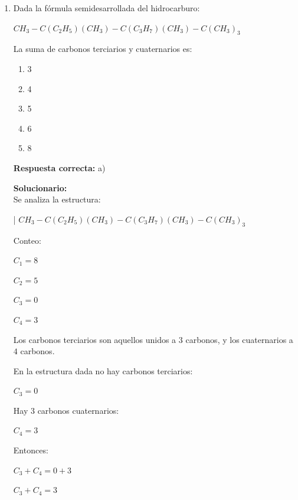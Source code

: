 \begin{enumerate}
	\vspace{2mm}
	\textbf{Solucionario:}\\
	
	$\rho_{aire}=?$
	
	$T=2^\circ C=275^\circ K$
	
	$PM_{aire}=28,97\ g/mol$
	
	$P=50\ cm\ de\ Hg=500\ mm\ de\ Hg$
	
	$PV=nRT$
	
	$n=\dfrac{w}{PM}$
	
	$PV=\dfrac{w}{PM}RT$
	
	$P\,PM=\rho RT$
	
	$\rho=\dfrac{P\,PM}{RT}$
	
	$\rho=\dfrac{(500\ mmHg)(28,97\ g/mol)}{(62,4\ mmHg\cdot L/mol\cdot K)(275^\circ K)}=$
	
	\vspace{6mm}
	
	\item Dada la fórmula semidesarrollada del hidrocarburo:
	
	$CH_3-C(C_2H_5)(CH_3)-C(C_3H_7)(CH_3)-C(CH_3)_3$
	
	La suma de carbonos terciarios y cuaternarios es:
	
	\begin{enumerate}[label=\alph*)]
		\item 3
		\item 4
		\item 5
		\item 6
		\item 8
	\end{enumerate}
	\textbf{Respuesta correcta:} a)
	
	\vspace{2mm}
	\textbf{Solucionario:}\\
	
	Se analiza la estructura:
	
	|	$CH_3-C(C_2H_5)(CH_3)-C(C_3H_7)(CH_3)-C(CH_3)_3$
	
	Conteo:
	
	$C_1=8$
	
	$C_2=5$
	
	$C_3=0$
	
	$C_4=3$
	
	Los carbonos terciarios son aquellos unidos a $3$ carbonos, y los cuaternarios a $4$ carbonos.
	
	En la estructura dada no hay carbonos terciarios:
	
	$C_3=0$
	
	Hay $3$ carbonos cuaternarios:
	
	$C_4=3$
	
	Entonces:
	
	$C_3+C_4=0+3$
	
	$C_3+C_4=3$
	\vspace{6mm}
	
\end{enumerate}







